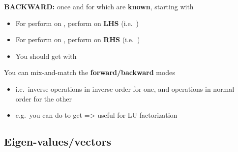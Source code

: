 \hSep %

\textbf{BACKWARD:} once  and
 for which  are
\textbf{known}, starting with \iMbox{[I_{m} \ | \ A \ | \ I_{n}]}

\begin{itemize}

      \item
            For  perform  on
            , perform  on \textbf{LHS}
            (i.e.~)
      \item
            For  perform  on ,
            perform  on \textbf{RHS}
            (i.e.~)
      \item
            You should get
            \iMbox{\ds [I_{m} \ | \ A \ | \ I_{n}] \rightsquigarrow [R^{-1} \ | \ A' \ | \ C^{-1}]}
            with 
\end{itemize}

\hSep %

You can mix-and-match the \textbf{forward/backward} modes

\begin{itemize}

      \item
            i.e.~inverse operations in inverse order for one, and operations in
            normal order for the other
      \item
            e.g.~you can do
            \iMbox{\ds [I_{m} \ | \ A \ | \ I_{n}] \rightsquigarrow [R^{-1} \ | \ A' \ | \ C]}
            to get  => useful for LU
            factorization
\end{itemize}


\subsection*{Eigen-values/vectors}


